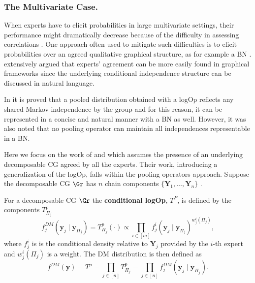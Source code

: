 \subsubsection{The Multivariate Case.}
When experts have to elicit probabilities in large multivariate settings, their performance might dramatically decrease because of the difficulty in assessing correlations \citep{Clemen2000,Winkler2004}. One approach often used to mitigate such difficulties is to elicit probabilities over an agreed qualitative graphical structure, as for example a \gls{BN} \citep{Burns1993, Faria1997, Farr2015, Renooij2001,Smith2000}. \citet{Smith1996a} extensively argued that experts' agreement can be more easily found in graphical frameworks since the underlying conditional independence structure can be discussed in natural language.

 In \citet{Pennock2005} it is proved that a pooled distribution obtained with a \gls{logOp} reflects any shared Markov independence by the group and for this reason, it can be represented in a concise and natural manner with a \gls{BN} as well. However, it was also noted that no pooling operator can maintain all independences representable in a \gls{BN}. 
 
 Here we focus on the work of \citet{Faria1996} and \citet{Faria1997} which assumes the presence of an underlying decomposable \gls{CG} agreed by all the experts. Their work, introducing a generalization of the \gls{logOp}, falls within the pooling operators approach. Suppose the decomposable \gls{CG} $\Gr$ has $n$ chain components $\{\bm{Y}_1,\dots,\bm{Y}_n\}$ .
 
\begin{definition}
For a decomposable \gls{CG} $\Gr$ the \textbf{conditional \gls{logOp}}, $T^P$, is defined by the components $T^p_{\Pi_j}$ 
\begin{equation*}
\label{eq:clogop}
f^{DM}_j(\bm{y}_j\;|\;\bm{y}_{\Pi_j})=T^p_{\Pi_j}(\cdot)\propto \prod_{i\in[m]}f_{j}^i(\bm{y}_j\;|\; \bm{y}_{\Pi_j})^{w_{j}^i(\Pi_j)},
\end{equation*}
where $f_{j}^i$ is is the conditional density relative to $\bm{Y}_j$ provided by the $i$-th expert and $w_{j}^i(\Pi_j)$ is a weight. The \gls{DM} distribution is then defined as
\begin{equation*}
f^{DM}(\bm{y})=T^p=\prod_{j\in[n]}T^p_{\Pi_j}=\prod_{j\in[n]}  f^{DM}_j(\bm{y}_j\;|\;\bm{y}_{\Pi_j}).
\end{equation*}
\end{definition}

